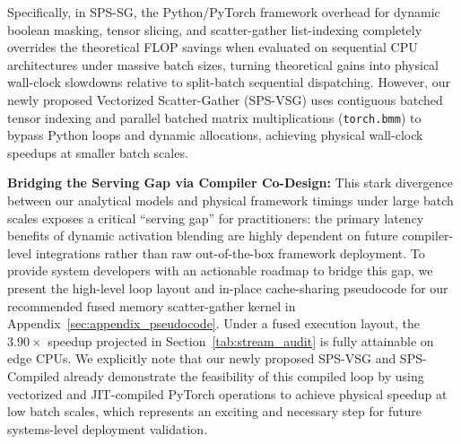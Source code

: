 Specifically, in SPS-SG, the Python/PyTorch framework overhead for dynamic boolean masking, tensor slicing, and scatter-gather list-indexing completely overrides the theoretical FLOP savings when evaluated on sequential CPU architectures under massive batch sizes, turning theoretical gains into physical wall-clock slowdowns relative to split-batch sequential dispatching.
However, our newly proposed Vectorized Scatter-Gather (SPS-VSG) uses contiguous batched tensor indexing and parallel batched matrix multiplications (\texttt{torch.bmm}) to bypass Python loops and dynamic allocations, achieving physical wall-clock speedups at smaller batch scales.


\textbf{Bridging the Serving Gap via Compiler Co-Design:} 
This stark divergence between our analytical models and physical framework timings under large batch scales exposes a critical ``serving gap'' for practitioners: the primary latency benefits of dynamic activation blending are highly dependent on future compiler-level integrations rather than raw out-of-the-box framework deployment.
To provide system developers with an actionable roadmap to bridge this gap, we present the high-level loop layout and in-place cache-sharing pseudocode for our recommended fused memory scatter-gather kernel in Appendix~\ref{sec:appendix_pseudocode}.
Under a fused execution layout, the $3.90\times$ speedup projected in Section~\ref{tab:stream_audit} is fully attainable on edge CPUs.
We explicitly note that our newly proposed SPS-VSG and SPS-Compiled already demonstrate the feasibility of this compiled loop by using vectorized and JIT-compiled PyTorch operations to achieve physical speedup at low batch scales, which represents an exciting and necessary step for future systems-level deployment validation.


